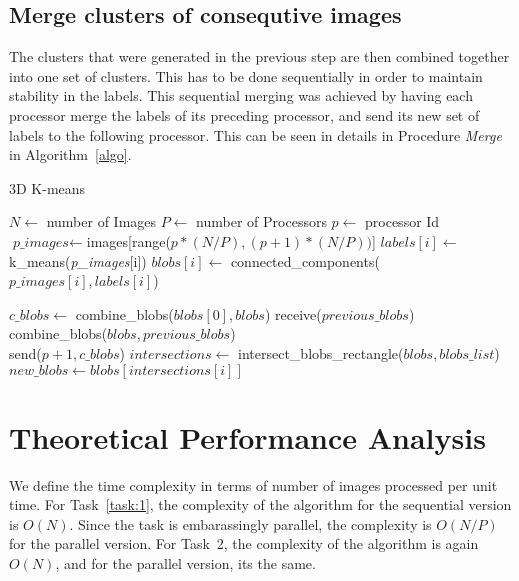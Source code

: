 \documentclass{article}
\begin{document}
		\subsection{Merge clusters of consequtive images}
			The clusters that were generated in the previous step are then combined together into one set of clusters. This has to be done sequentially in order to maintain stability in the labels. This sequential merging was achieved by having each processor merge the labels of its preceding processor, and send its new set of labels to the following processor. This can be seen in details in Procedure \textit{Merge} in Algorithm~\ref{algo}.
		\begin{algorithm}
			\caption{3D K-means}\label{algo}
			\begin{algorithmic}[1]
				\State $N \gets$ number of Images
				\State $P \gets$ number of Processors
				\State $p \gets$ processor Id
				\State $\textit{p\_images} \gets $images[range($p*(N/P), (p+1)*(N/P))$]$ $
				\State $labels[i] \gets$ k\_means(\textit{p\_images}[i])
				\State $blobs[i] \gets$ connected\_components($p\_images[i], labels[i]$)
				\EndFor
			
				\EndProcedure
				
				\State $c\_blobs \gets$ combine\_blobs($blobs[0], blobs$)
					\State receive($previous\_blobs$)
					\State combine\_blobs($blobs, previous\_blobs$)\\
				\EndIf
					\State send($p+1, c\_blobs$)
				\EndProcedure
				\State $intersections \gets$ intersect\_blobs\_rectangle($blobs, blobs\_list$)
					\State $new\_blobs \gets blobs[intersections[i]]$
				\EndFor
				\EndProcedure
			\end{algorithmic}
		\end{algorithm}
		
		
	\section{Theoretical Performance Analysis}
		We define the time complexity in terms of number of images processed per unit time. For Task~\ref{task:1}, the complexity of the algorithm for the sequential version is $O(N)$. Since the task is embarassingly parallel, the complexity is $O(N/P)$ for the parallel version. For Task~2, the complexity of the algorithm is again $O(N)$, and for the parallel version, its the same.
	
\end{document}

